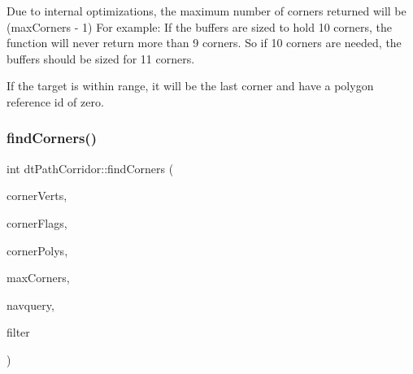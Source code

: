 Due to internal optimizations, the maximum number of corners returned will be ({\ttfamily max\+Corners} -\/ 1) For example\+: If the buffers are sized to hold 10 corners, the function will never return more than 9 corners. So if 10 corners are needed, the buffers should be sized for 11 corners.

If the target is within range, it will be the last corner and have a polygon reference id of zero. \mbox{\label{classdtPathCorridor_aa1076957ddf987a274a756fbf8202cab}} 
\subsubsection{\texorpdfstring{find\+Corners()}{findCorners()}\hspace{0.1cm}{\footnotesize\ttfamily [2/2]}}
{\footnotesize\ttfamily int dt\+Path\+Corridor\+::find\+Corners (\begin{DoxyParamCaption}\item[{float $\ast$}]{corner\+Verts,  }\item[{unsigned char $\ast$}]{corner\+Flags,  }\item[{\hyperlink{group__detour_gab4e0b2257a670c1a800057999612b466}{dt\+Poly\+Ref} $\ast$}]{corner\+Polys,  }\item[{const int}]{max\+Corners,  }\item[{\hyperlink{classdtNavMeshQuery}{dt\+Nav\+Mesh\+Query} $\ast$}]{navquery,  }\item[{const \hyperlink{classdtQueryFilter}{dt\+Query\+Filter} $\ast$}]{filter }\end{DoxyParamCaption})}


